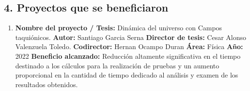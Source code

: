 \begin{spacing}{1.5}
    \begin{tightcenter}
    \section{4. Proyectos que se beneficiaron}
    \end{tightcenter}
    
    \begin{enumerate}
        \item \textbf{Nombre del proyecto / Tesis:} Dinámica del universo con Campos taquiónicos. \newline
        \textbf{Autor:} Santiago Garcia Serna \newline
        \textbf{Director de tesis:} Cesar Alonso Valenzuela Toledo. \newline
        \textbf{Codirector:} Hernan Ocampo Duran \newline
        \textbf{Área:} Física \newline
        \textbf{Año:} 2022 \newline
        \textbf{Beneficio alcanzado:} Reducción altamente significativa en el tiempo destinado a los cálculos para la realización de pruebas y un aumento proporcional en la cantidad de tiempo dedicado al análisis y examen de los resultados obtenidos.
    \end{enumerate}

    
    \mylinespacing
    \mylinespacing
    \begin{tightcenter}
    \end{tightcenter}
    \end{spacing}
    